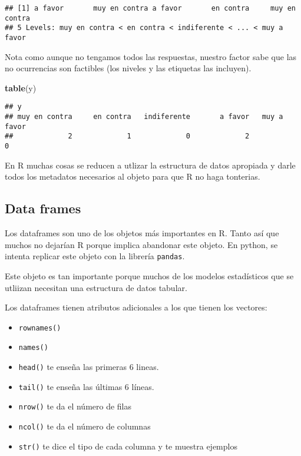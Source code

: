 \documentclass[]{article}
\newenvironment{Shaded}{\begin{snugshade}}{\end{snugshade}}
\newcommand{\KeywordTok}[1]{\textcolor[rgb]{0.13,0.29,0.53}{\textbf{{#1}}}}
\newcommand{\NormalTok}[1]{{#1}}
\begin{document}
\begin{verbatim}
## [1] a favor       muy en contra a favor       en contra     muy en contra
## 5 Levels: muy en contra < en contra < indiferente < ... < muy a favor
\end{verbatim}

Nota como aunque no tengamos todos las respuestas, nuestro factor sabe
que las no ocurrencias son factibles (los niveles y las etiquetas las
incluyen).

\begin{Shaded}
\begin{Highlighting}[]
\KeywordTok{table}\NormalTok{(y)}
\end{Highlighting}
\end{Shaded}

\begin{verbatim}
## y
## muy en contra     en contra   indiferente       a favor   muy a favor 
##             2             1             0             2             0
\end{verbatim}

\begin{nota}[Nota]
En R muchas cosas se reducen a utlizar la estructura de datos apropiada y darle
todos los metadatos necesarios al objeto para que R no haga tonterias.
\end{nota}

\subsection{Data frames}\label{data-frames}

Los dataframes son uno de los objetos más importantes en R. Tanto así
que muchos no dejarían R porque implica abandonar este objeto. En
python, se intenta replicar este objeto con la librería \texttt{pandas}.

Este objeto es tan importante porque muchos de los modelos estadísticos
que se utliizan necesitan una estructura de datos tabular.

Los dataframes tienen atributos adicionales a los que tienen los
vectores:

\begin{itemize}
\itemsep1pt\parskip0pt
\item
  \texttt{rownames()}
\item
  \texttt{names()}
\item
  \texttt{head()} te enseña las primeras 6 lineas.
\item
  \texttt{tail()} te enseña las últimas 6 líneas.
\item
  \texttt{nrow()} te da el número de filas
\item
  \texttt{ncol()} te da el número de columnas
\item
  \texttt{str()} te dice el tipo de cada columna y te muestra ejemplos
\end{itemize}
\end{document}
